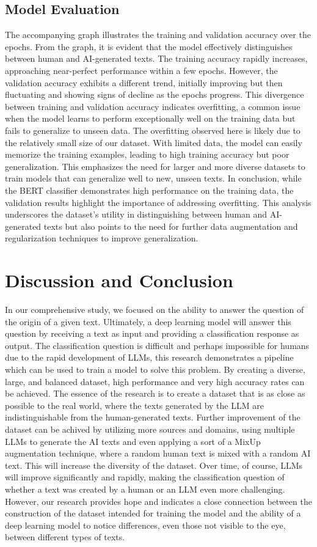 \documentclass[11pt]{article}
\begin{document}
\subsection{Model Evaluation}
The accompanying graph illustrates the training and validation accuracy over the epochs.
From the graph, it is evident that the model effectively distinguishes between human and AI-generated texts. The training accuracy rapidly increases, approaching near-perfect performance within a few epochs. However, the validation accuracy exhibits a different trend, initially improving but then fluctuating and showing signs of decline as the epochs progress. This divergence between training and validation accuracy indicates overfitting, a common issue when the model learns to perform exceptionally well on the training data but fails to generalize to unseen data.
The overfitting observed here is likely due to the relatively small size of our dataset. With limited data, the model can easily memorize the training examples, leading to high training accuracy but poor generalization. This emphasizes the need for larger and more diverse datasets to train models that can generalize well to new, unseen texts.
In conclusion, while the BERT classifier demonstrates high performance on the training data, the validation results highlight the importance of addressing overfitting. This analysis underscores the dataset's utility in distinguishing between human and AI-generated texts but also points to the need for further data augmentation and regularization techniques to improve generalization.

\section{Discussion and Conclusion}
In our comprehensive study, we focused on the ability to answer the question of the origin of a given text. Ultimately, a deep learning model will answer this question by receiving a text as input and providing a classification response as output. The classification question is difficult and perhaps impossible for humans due to the rapid development of LLMs, this research demonstrates a pipeline which can be used to train a model to solve this problem. By creating a diverse, large, and balanced dataset, high performance and very high accuracy rates can be achieved.
The essence of the research is to create a dataset that is as close as possible to the real world, where the texts generated by the LLM are indistinguishable from the human-generated texts. Further improvement of the dataset can be achived by utilizing more sources and domains, using multiple LLMs to generate the AI texts and even applying a sort of a MixUp augmentation technique, where a random human text is mixed with a random AI text. This will increase the diversity of the dataset.
Over time, of course, LLMs will improve significantly and rapidly, making the classification question of whether a text was created by a human or an LLM even more challenging. However, our research provides hope and indicates a close connection between the construction of the dataset intended for training the model and the ability of a deep learning model to notice differences, even those not visible to the eye, between different types of texts.
\end{document}
